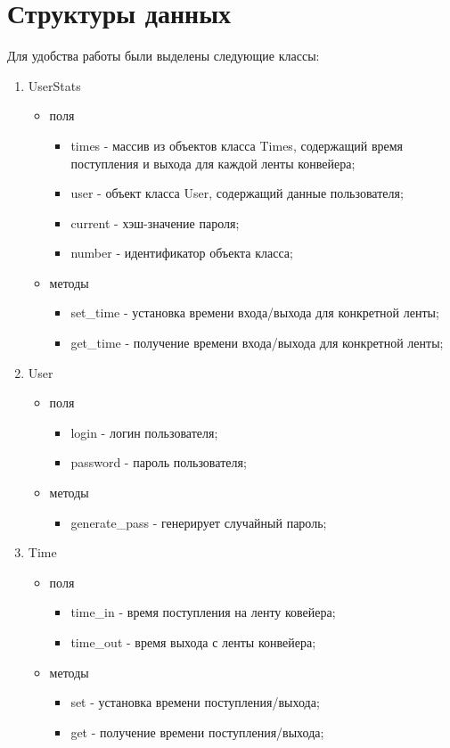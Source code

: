 \documentclass[../report.tex]{subfiles}
\begin{document}
\section{Структуры данных}
Для удобства работы были выделены следующие классы:
\begin{enumerate}
	\item UserStats
	\begin{itemize}
		\item поля
		\begin{itemize}
			\item times - массив из объектов класса Times, содержащий время поступления и выхода для каждой ленты конвейера;
			\item user - объект класса User, содержащий данные пользователя;
			\item current - хэш-значение пароля;
			\item number - идентификатор объекта класса;
		\end{itemize}
		\item методы
		\begin{itemize}
			\item set\_time - установка времени входа/выхода для конкретной ленты;
			\item get\_time - получение времени входа/выхода для конкретной ленты;
		\end{itemize}
	\end{itemize}
	\item User
	\begin{itemize}
		\item поля
		\begin{itemize}
			\item login - логин пользователя;
			\item password - пароль пользователя;
		\end{itemize}
		\item методы
		\begin{itemize}
			\item generate\_pass - генерирует случайный пароль;
		\end{itemize}
	\end{itemize}
	\item Time
	\begin{itemize}
		\item поля
		\begin{itemize}
			\item time\_in - время поступления на ленту ковейера;
			\item time\_out - время выхода с ленты конвейера;
		\end{itemize}
		\item методы
		\begin{itemize}
			\item set - установка времени поступления/выхода;
			\item get - получение времени поступления/выхода;
		\end{itemize}
	\end{itemize}
\end{enumerate}
\end{document}
